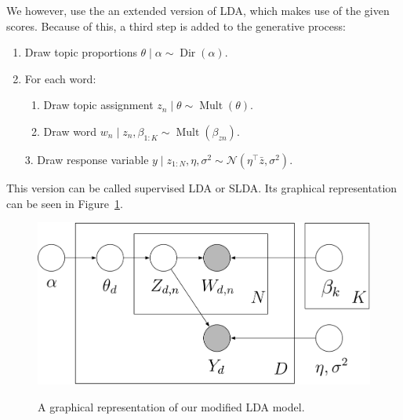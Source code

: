 \documentclass[a4paper,10pt]{article}
\DeclareMathOperator{\Dir}{Dir}
\DeclareMathOperator{\Mult}{Mult}
\begin{document}
We however, use the an extended version of LDA, which makes use of the given scores. 
Because of this, a third step is added to the generative process:

\begin{enumerate}
  \item Draw topic proportions $\theta \mid \alpha \sim \Dir(\alpha)$.
  \item For each word:
  \begin{enumerate}
    \item Draw topic assignment $z_n \mid \theta \sim \Mult(\theta)$.
    \item Draw word $w_n \mid z_n, \beta_{1:K} \sim \Mult(\beta_{zn})$.
  \end{enumerate}
  \item[3.] Draw response variable $y \mid z_{1:N}, \eta, \sigma^2 \sim \mathcal{N}(\eta^\top \bar{z}, \sigma^2)$.
\end{enumerate}

This version can be called supervised LDA or SLDA.
Its graphical representation can be seen in Figure~\ref{fig:SLDA}.

\begin{figure}[ht!]
  \centering
  \includegraphics[width=\textwidth]{SLDA.png}
  \label{fig:SLDA}
  \caption{A graphical representation of our modified LDA model.}
\end{figure}
\end{document}
